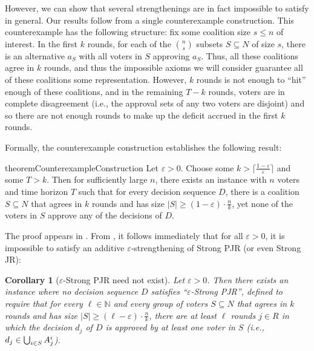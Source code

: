 \documentclass[10pt]{scrartcl}
\theoremstyle{plain}
\newtheorem{corollary}[theorem]{Corollary}
\theoremstyle{definition}
\renewcommand*{\le}{\leqslant}
\renewcommand*{\ge}{\geqslant}
\renewcommand*{\geq}{\geqslant}
\renewcommand{\epsilon}{\varepsilon}
\begin{document}
However, we can show that several strengthenings are in fact impossible to satisfy in general. Our results follow from a single counterexample construction. This counterexample has the following structure: fix some coalition size $s \le n$ of interest. In the first $k$ rounds, for each of the $\binom{n}{s}$ subsets $S\subseteq N$ of size $s$, there is an alternative $a_S$ with all voters in $S$ approving $a_S$. Thus, all these coalitions agree in $k$ rounds, and thus the impossible axioms we will consider guarantee all of these coalitions some representation. However, $k$ rounds is not enough to ``hit'' enough of these coalitions, and in the remaining $T - k$ rounds, voters are in complete disagreement (i.e., the approval sets of any two voters are disjoint) and so there are not enough rounds to make up the deficit accrued in the first $k$ rounds.

Formally, the counterexample construction establishes the following result:

\begin{restatable}{theorem}{CounterexampleConstruction}
	\label{thm:counterexample-construction}
	Let $\epsilon > 0$. Choose some $k > \lceil \frac{1-\epsilon}{\epsilon} \rceil$ and some $T > k$. Then for sufficiently large $n$, there exists an instance with $n$ voters  and time horizon $T$ such that for every decision sequence $D$, there is a coalition $S \subseteq N$ that agrees in $k$ rounds and has size $|S| \ge (1 - \epsilon) \cdot \frac{n}{k}$, yet none of the voters in $S$ approve any of the decisions of $D$.
\end{restatable}
\noindent
The proof appears in .
From , it follows immediately that for all $\epsilon > 0$, it is impossible to satisfy an additive $\epsilon$-strengthening of Strong PJR (or even Strong JR):

\begin{corollary}[$\epsilon$-Strong PJR need not exist]
	Let $\epsilon > 0$. 
	Then there exists an instance where no decision sequence $D$ satisfies ``\emph{$\epsilon$-Strong PJR}'', defined to require that 
	for every $\ell \in \mathbb N$ and every group of voters $S \subseteq N$ that agrees in $k$ rounds and has size $|S| \geq (\ell  - \epsilon)\cdot \frac{n}{k}$, there are at least $\ell$ rounds $j \in R$ in which the decision $d_j$ of $D$ is approved by at least one voter in $S$ (i.e., $d_j \in \bigcup_{i \in S} \smash{A_j^i}$).
\end{corollary}
\end{document}
